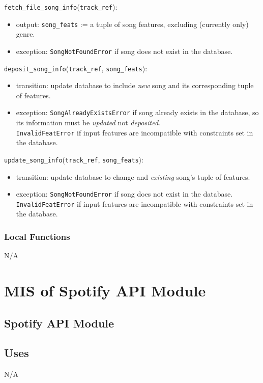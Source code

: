 \documentclass[12pt, titlepage]{article}
\begin{document}
\noindent \texttt{fetch\_file\_song\_info}(\texttt{track\_ref}):
\begin{itemize}
\item output: \texttt{song\_feats} := a tuple of song features, excluding (currently only) genre.
\item exception: \texttt{SongNotFoundError} if song does not exist in the database.
\end{itemize}

\noindent \texttt{deposit\_song\_info}(\texttt{track\_ref}, \texttt{song\_feats}):
\begin{itemize}
\item transition: update database to include \emph{new} song and its corresponding tuple of features.
\item exception: \texttt{SongAlreadyExistsError} if song already exists in the database, so its information must be \emph{updated} not \emph{deposited}. \\ \texttt{InvalidFeatError} if input features are incompatible with constraints set in the database.
\end{itemize}

\noindent \texttt{update\_song\_info}(\texttt{track\_ref}, \texttt{song\_feats}):
\begin{itemize}
\item transition: update database to change and \emph{existing} song's tuple of features.
\item exception: \texttt{SongNotFoundError} if song does not exist in the database. \\ \texttt{InvalidFeatError} if input features are incompatible with constraints set in the database.
\end{itemize}

\subsubsection{Local Functions}
N/A

\newpage

\section{MIS of Spotify API Module} 

\subsection{Spotify API Module}

\subsection{Uses}
N/A
\end{document}
